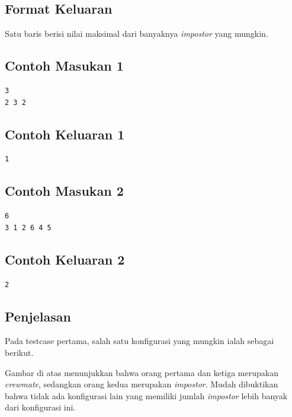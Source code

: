 \documentclass{article}
\begin{document}
\subsection*{Format Keluaran}
Satu baris berisi nilai maksimal dari banyaknya \textit{impostor} yang mungkin.

\begin{multicols}{2}
\subsection*{Contoh Masukan 1}
\begin{lstlisting}
3
2 3 2
\end{lstlisting}
\columnbreak

\subsection*{Contoh Keluaran 1}
\begin{lstlisting}
1
\end{lstlisting}
\vfill
\null
\end{multicols}

\begin{multicols}{2}
\subsection*{Contoh Masukan 2}
\begin{lstlisting}
6
3 1 2 6 4 5
\end{lstlisting}
\columnbreak

\subsection*{Contoh Keluaran 2}
\begin{lstlisting}
2
\end{lstlisting}
\vfill
\null
\end{multicols}

\subsection*{Penjelasan}
Pada testcase pertama, salah satu konfigurasi yang mungkin ialah sebagai berikut.

\begin{center}
\end{center}
Gambar di atas menunjukkan bahwa orang pertama dan ketiga merupakan \textit{crewmate}, sedangkan orang kedua merupakan \textit{impostor}. Mudah dibuktikan bahwa tidak ada konfigurasi lain yang memiliki jumlah \textit{impostor} lebih banyak dari konfigurasi ini.\newline
\end{document}
